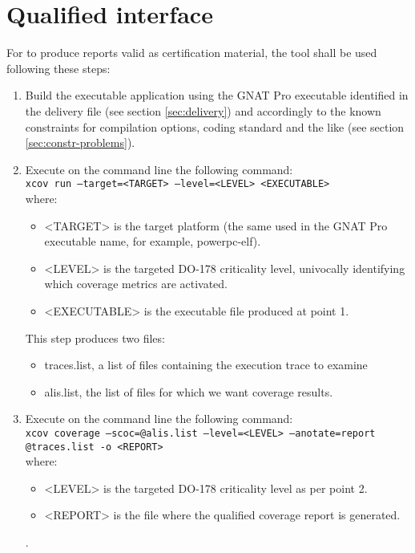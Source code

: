 \documentclass {report}
\begin{document}
\section{Qualified interface}
\label{sec:qual-interface}
For \xcov to produce reports valid as certification material, the tool shall be used following these steps:
\begin{enumerate}
\item Build the executable application using the GNAT Pro executable identified in the delivery file (see section \ref{sec:delivery}) and accordingly to the known constraints for compilation options, coding standard and the like (see section \ref{sec:constr-problems}).

\item Execute on the command line the following command:\\

\texttt{xcov run --target=<TARGET> --level=<LEVEL> <EXECUTABLE>} \\

where:
\begin{itemize}
\item <TARGET> is the target platform (the same used in the GNAT Pro executable name, for example, powerpc-elf).
\item <LEVEL> is the targeted DO-178 criticality level, univocally identifying which coverage metrics are activated.
\item <EXECUTABLE> is the executable file produced at point 1.
\end{itemize}

This step produces two files:
\begin{itemize}
\item traces.list, a list of files containing the execution trace to examine
\item alis.list, the list of files for which we want coverage results.
\end{itemize}

\item Execute on the command line the following command:\\

\texttt{xcov coverage --scoc=@alis.list --level=<LEVEL> --anotate=report @traces.list -o <REPORT>} \\

where:

\begin{itemize}
\item <LEVEL> is the targeted DO-178 criticality level as per point 2.
\item <REPORT> is the file where the qualified coverage report is generated.
\end{itemize}.

\end{enumerate}
\end{document}
